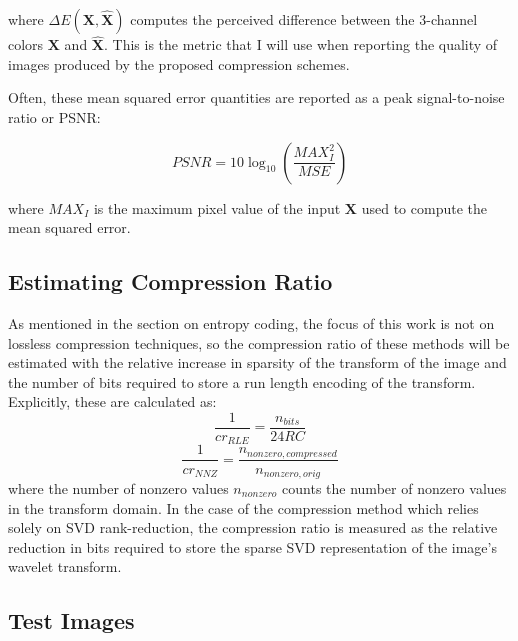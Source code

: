 \documentclass[conference]{IEEEtran}
\begin{document}
where $\Delta E(\mathbf{X}, \mathbf{\hat{X}})$ computes the perceived difference between the 3-channel colors $\mathbf{X}$ and $\mathbf{\hat{X}}$.
This is the metric that I will use when reporting the quality of images produced by the proposed compression schemes.

Often, these mean squared error quantities are reported as a peak signal-to-noise ratio or PSNR:

\begin{equation}
    PSNR = 10\log_{10}\left(\frac{MAX_I^2}{MSE}\right)
\end{equation}

where $MAX_I$ is the maximum pixel value of the input $\mathbf{X}$ used to compute the mean squared error.

\subsection{Estimating Compression Ratio}

As mentioned in the section on entropy coding, the focus of this work is not on lossless compression techniques, so the compression ratio of these methods will be estimated with the relative increase in sparsity of the transform of the image and the number of bits required to store a run length encoding of the transform.
Explicitly, these are calculated as:
\begin{equation}
    \frac{1}{cr_{RLE}} = \frac{n_{bits}}{24RC}
\end{equation}
\begin{equation}
    \frac{1}{cr_{NNZ}} = \frac{n_{nonzero,compressed}}{n_{nonzero,orig}}
\end{equation}
where the number of nonzero values $n_{nonzero}$ counts the number of nonzero values in the transform domain.
In the case of the compression method which relies solely on SVD rank-reduction, the compression ratio is measured as the relative reduction in bits required to store the sparse SVD representation of the image's wavelet transform.

\subsection{Test Images}
\end{document}
